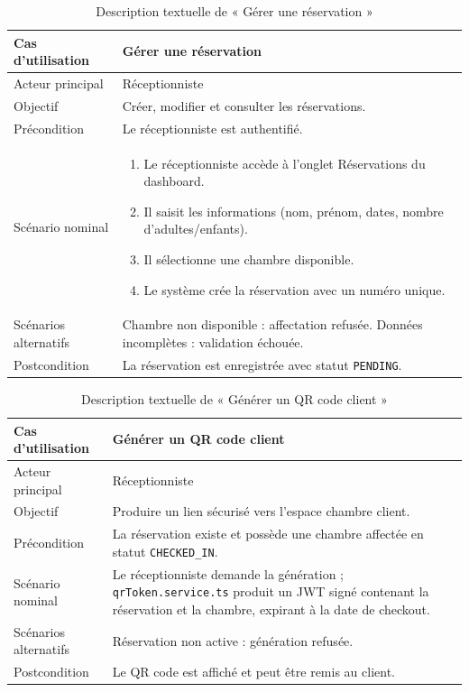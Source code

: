 \begin{table}[H]
\centering
\caption{Description textuelle de « Gérer une réservation »}
\small
\begin{tabularx}{\textwidth}{|p{3.5cm}|X|}
\hline
Cas d'utilisation & Gérer une réservation \\ \hline
Acteur principal & Réceptionniste \\ \hline
Objectif & Créer, modifier et consulter les réservations. \\ \hline
Précondition & Le réceptionniste est authentifié. \\ \hline
Scénario nominal &
\begin{enumerate}[nosep]
\item Le réceptionniste accède à l'onglet Réservations du dashboard.
\item Il saisit les informations (nom, prénom, dates, nombre d'adultes/enfants).
\item Il sélectionne une chambre disponible.
\item Le système crée la réservation avec un numéro unique.
\end{enumerate} \\ \hline
Scénarios alternatifs & Chambre non disponible : affectation refusée. Données incomplètes : validation échouée. \\ \hline
Postcondition & La réservation est enregistrée avec statut \texttt{PENDING}. \\ \hline
\end{tabularx}
\end{table}

\begin{table}[H]
\centering
\caption{Description textuelle de « Générer un QR code client »}
\small
\begin{tabularx}{\textwidth}{|p{3.5cm}|X|}
\hline
Cas d'utilisation & Générer un QR code client \\ \hline
Acteur principal & Réceptionniste \\ \hline
Objectif & Produire un lien sécurisé vers l'espace chambre client. \\ \hline
Précondition & La réservation existe et possède une chambre affectée en statut \texttt{CHECKED\_IN}. \\ \hline
Scénario nominal & Le réceptionniste demande la génération ; \texttt{qrToken.service.ts} produit un JWT signé contenant la réservation et la chambre, expirant à la date de checkout. \\ \hline
Scénarios alternatifs & Réservation non active : génération refusée. \\ \hline
Postcondition & Le QR code est affiché et peut être remis au client. \\ \hline
\end{tabularx}
\end{table}

